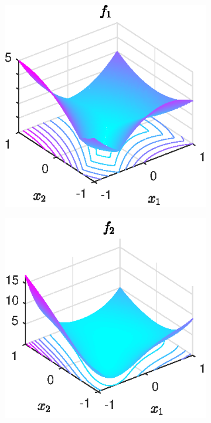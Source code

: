 \begin{figure}[ht]%
	\begin{subfigure}[t]{0.32\textwidth}
		\includegraphics[width=\textwidth]{Pictures/Plots/testfun_f1.eps}
	\end{subfigure}
	\begin{subfigure}[t]{0.32\textwidth}
		\includegraphics[width=\textwidth]{Pictures/Plots/testfun_f2.eps}

\end{subfigure}
\end{figure}
